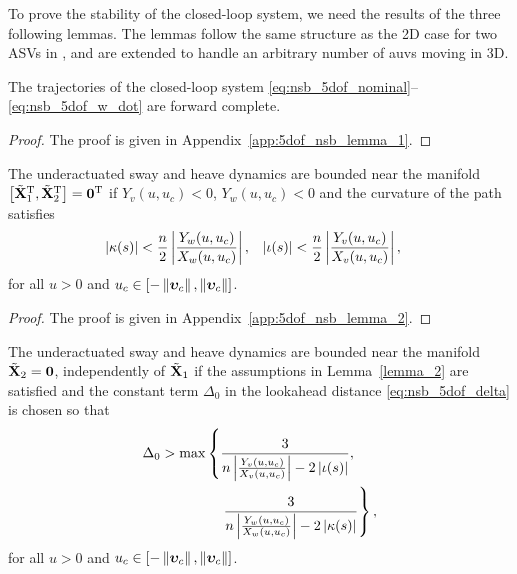To prove the stability of the closed-loop system, we need the results of the three following lemmas.
The lemmas follow the same structure as the 2D case for two ASVs in \cite{eek_formation_2021}, and are extended to handle an arbitrary number of \glspl{auv} moving in 3D.
\begin{lemma}
    \label{lemma_1}
    The trajectories of the closed-loop system \eqref{eq:nsb_5dof_nominal}--\eqref{eq:nsb_5dof_w_dot} are forward complete.
\end{lemma}

\begin{proof}
    The proof is given in Appendix~\ref{app:5dof_nsb_lemma_1}.
\end{proof}

\begin{lemma}
    \label{lemma_2}
    The underactuated sway and heave dynamics are bounded near the manifold $\left[\tilde{\mathbf{X}}_1^{\mathrm{T}}, \tilde{\mathbf{X}}_2^{\mathrm{T}}\right] = \mathbf{0}^{\mathrm{T}}$ if $Y_v(u, u_c) < 0$, $Y_w(u, u_c) < 0$ and the curvature of the path satisfies
    \begin{align}
        \left|\kappa(s)\right| &< \frac{n}{2}\left|\frac{Y_w(u, u_c)}{X_w(u, u_c)}\right|, &
        \left|\iota(s)\right| &< \frac{n}{2}\left|\frac{Y_v(u, u_c)}{X_v(u, u_c)}\right|, \label{eq:nsb_5dof_curvature_limit}
    \end{align}
    for all $u > 0$ and $u_c \in [-\left\|\bm{\upsilon}_c\right\|, \left\|\bm{\upsilon}_c\right\|]$.
\end{lemma}

\begin{proof}
    The proof is given in Appendix~\ref{app:5dof_nsb_lemma_2}.
\end{proof}

\begin{lemma}
    \label{lemma_3}
    The underactuated sway and heave dynamics are bounded near the manifold $\tilde{\mathbf{X}}_2 = \mathbf{0}$, independently of $\tilde{\mathbf{X}}_1$ if the assumptions in Lemma~\ref{lemma_2} are satisfied and the constant term $\Delta_0$ in the lookahead distance \eqref{eq:nsb_5dof_delta} is chosen so that
    \begin{equation}
        \begin{split}
            \Delta_0 > \max&\left\{\frac{3}{n\left|\frac{Y_v\left(u, u_c\right)}{X_v\left(u, u_c\right)}\right| - 2\left|\iota(s)\right|}, \right. \\
            & \quad \left. \frac{3}{n\left|\frac{Y_w\left(u, u_c\right)}{X_w\left(u, u_c\right)}\right| - 2\left|\kappa(s)\right|}\right\},
        \end{split} \label{eq:nsb_5dof_lookahead_limit}
    \end{equation}
    for all $u > 0$ and $u_c \in [-\left\|\bm{\upsilon}_c\right\|, \left\|\bm{\upsilon}_c\right\|]$.
\end{lemma}

